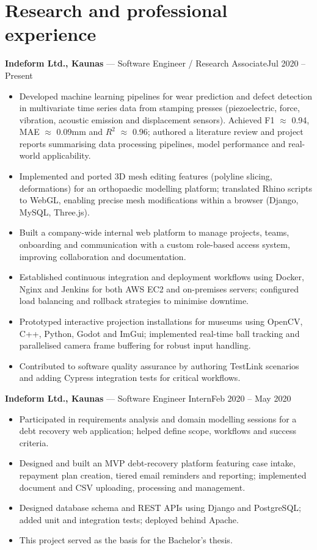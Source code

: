 \documentclass[10pt,a4paper]{article}
\newcommand{\entry}[3]{\noindent\textbf{#1} — #2\hfill #3\\}
\begin{document}
\section*{Research and professional experience}
\entry{Indeform Ltd., Kaunas}{Software Engineer / Research Associate}{Jul 2020 -- Present}
\vspace{-0.8em}
\begin{itemize}[leftmargin=*, topsep=0em]
  \item Developed machine learning pipelines for wear prediction and defect detection in multivariate time series data from stamping presses (piezoelectric, force, vibration, acoustic emission and displacement sensors). Achieved F1 $\approx$ 0.94, MAE $\approx$ 0.09mm and $R^2$ $\approx$ 0.96; authored a literature review and project reports summarising data processing pipelines, model performance and real-world applicability.
  \item Implemented and ported 3D mesh editing features (polyline slicing, deformations) for an orthopaedic modelling platform; translated Rhino scripts to WebGL, enabling precise mesh modifications within a browser (Django, MySQL, Three.js).
  \item Built a company-wide internal web platform to manage projects, teams, onboarding and communication with a custom role-based access system, improving collaboration and documentation.
  \item Established continuous integration and deployment workflows using Docker, Nginx and Jenkins for both AWS EC2 and on-premises servers; configured load balancing and rollback strategies to minimise downtime.
  \item Prototyped interactive projection installations for museums using OpenCV, C++, Python, Godot and ImGui; implemented real-time ball tracking and parallelised camera frame buffering for robust input handling.
  \item Contributed to software quality assurance by authoring TestLink scenarios and adding Cypress integration tests for critical workflows.
\end{itemize}

\entry{Indeform Ltd., Kaunas}{Software Engineer Intern}{Feb 2020 -- May 2020}
\vspace{-0.8em}
\begin{itemize}[leftmargin=*, topsep=0em]
  \item Participated in requirements analysis and domain modelling sessions for a debt recovery web application; helped define scope, workflows and success criteria.
  \item Designed and built an MVP debt-recovery platform featuring case intake, repayment plan creation, tiered email reminders and reporting; implemented document and CSV uploading, processing and management.
  \item Designed database schema and REST APIs using Django and PostgreSQL; added unit and integration tests; deployed behind Apache.
  \item This project served as the basis for the Bachelor's thesis.
\end{itemize}
\end{document}
